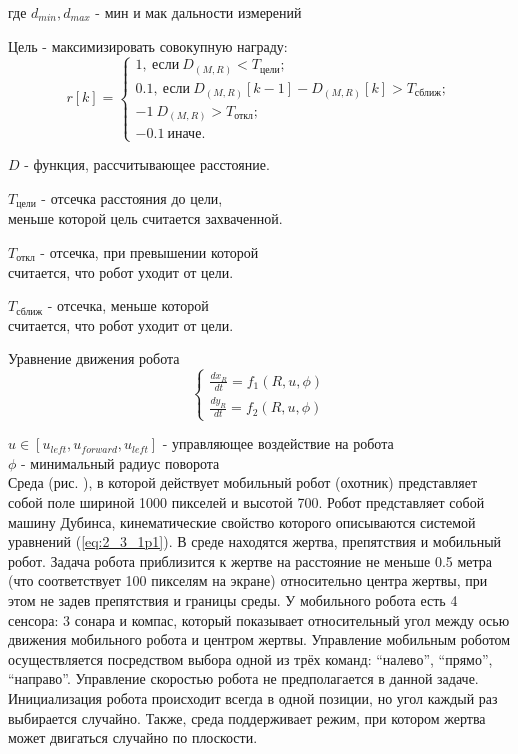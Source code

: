 где $ d_{min}, d_{max} $ - мин и мак дальности измерений


Цель - максимизировать совокупную награду:
$$
r[k] = \begin{cases}
1, \: \text{если} \: D_{(M, R)} < T_{\text{цели}}; \\
0.1, \: \text{если} \: D_{(M, R)}[k-1] - D_{(M, R)}[k] > T_{\text{сближ}}; \\
-1 \: D_{(M, R)} > T_{\text{откл}};\\
-0.1 \: \text{иначе}.
\end{cases}
$$



\noindent$ D $ - функция, рассчитывающее расстояние.

\noindent$ T_{\text{цели}} $ - отсечка расстояния до цели,\\
меньше которой цель считается захваченной.

\noindent$ T_{\text{откл}} $ - отсечка, при превышении которой\\
считается, что робот уходит от цели.

\noindent$ T_{\text{сближ}} $ - отсечка, меньше которой\\
считается, что робот уходит от цели.

Уравнение движения робота
$$
\begin{cases}
\frac{dx_R}{dt} = f_1(R, u, \phi) \\
\frac{dy_R}{dt} = f_2(R, u, \phi) 
\end{cases}
$$

\noindent$ u \in [u_{left}, u_{forward}, u_{left}]$ - управляющее воздействие на робота\\
\noindent $ \phi $ - минимальный радиус поворота\\

Среда (рис. ), в которой действует мобильный робот (охотник) представляет собой поле шириной 1000 пикселей и высотой 700. Робот представляет собой машину Дубинса, кинематические свойство которого описываются системой уравнений (\ref{eq:2_3_1p1}). В среде находятся жертва, препятствия и мобильный робот. Задача робота приблизится к жертве на расстояние не меньше 0.5 метра (что соответствует 100 пикселям на экране) относительно центра жертвы, при этом не задев препятствия и границы среды. У мобильного робота есть 4 сенсора: 3 сонара и компас, который показывает относительный угол между осью движения мобильного робота и центром жертвы. Управление мобильным роботом осуществляется посредством выбора одной из трёх команд: “налево”, “прямо”, “направо”. Управление скоростью робота не предполагается в данной задаче. Инициализация робота происходит всегда в одной позиции, но угол каждый раз выбирается случайно. Также, среда поддерживает режим, при котором жертва может двигаться случайно по плоскости.

